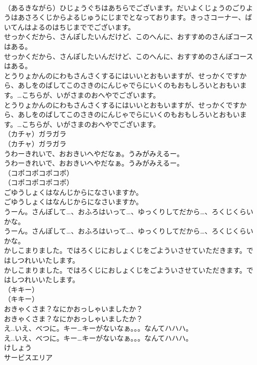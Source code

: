\documentclass[8pt]{extreport}
\begin{document}
\begin{CJK}{UTF8}{min}
\\	（あるきながら）ひじょうぐちはあちらでございます。だいよくじょうのごりようはあさろくじからよるじゅうにじまでとなっております。きっさコーナー、ばいてんはよるのはちじまででございます。
\\	せっかくだから、さんぽしたいんだけど、このへんに、おすすめのさんぽコースはある。
\\	せっかくだから、さんぽしたいんだけど、このへんに、おすすめのさんぽコースはある。
\\	とうりょかんのにわもさんさくするにはいいとおもいますが、せっかくですから、あしをのばしてこのさきのにんじゃでらにいくのもおもしろいとおもいます。…こちらが、いがさまのおへやでございます。
\\	とうりょかんのにわもさんさくするにはいいとおもいますが、せっかくですから、あしをのばしてこのさきのにんじゃでらにいくのもおもしろいとおもいます。…こちらが、いがさまのおへやでございます。
\\	（カチャ）ガラガラ
\\	（カチャ）ガラガラ
\\	うわーきれいで、おおきいへやだなぁ。うみがみえるー。
\\	うわーきれいで、おおきいへやだなぁ。うみがみえるー。
\\	（コポコポコポコポ）
\\	（コポコポコポコポ）
\\	ごゆうしょくはなんじからになさいますか。
\\	ごゆうしょくはなんじからになさいますか。
\\	うーん。さんぽして…、おふろはいって…、ゆっくりしてだから…、ろくじくらいかな。
\\	うーん。さんぽして…、おふろはいって…、ゆっくりしてだから…、ろくじくらいかな。
\\	かしこまりました。ではろくじにおしょくじをごよういさせていただきます。ではしつれいいたします。
\\	かしこまりました。ではろくじにおしょくじをごよういさせていただきます。ではしつれいいたします。
\\	（キキー）
\\	（キキー）
\\	おきゃくさま？なにかおっしゃいましたか？
\\	おきゃくさま？なにかおっしゃいましたか？
\\	え..いえ、べつに。キー…キーがないなぁ。。。なんてハハハ。
\\	え..いえ、べつに。キー…キーがないなぁ。。。なんてハハハ。
\\	けしょう
\\	サービスエリア

\end{CJK}
\end{document}
